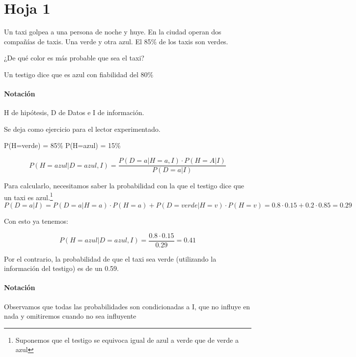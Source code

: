 
\section{Hoja 1}

\begin{problem}[1]

Un taxi golpea a una persona de noche y huye. En la ciudad operan dos compañías de taxis. Una verde y otra azul. El 85\% de los taxis son verdes. 

\ppart
¿De qué color es más probable que sea el taxi?

\ppart
Un testigo dice que es azul con fiabilidad del 80\%

\solution
\paragraph{Notación} H de hipótesis, D de Datos e I de información.

\spart
Se deja como ejercicio para el lector experimentado.

\spart
P(H=verde) = 85\%
P(H=azul) = 15\%

\[
P\left( H=azul | D=azul, I \right) = \frac{P(D=a|H=a,I)·P(H=A|I)}{P(D=a|I)}
\]

Para calcularlo, necesitamos saber la probabilidad con la que el testigo dice que un taxi es azul.\footnote{Suponemos que el testigo se equivoca igual de azul a verde que de verde a azul}
\[
P(D=a|I) = P(D=a|H=a)·P(H=a) + P(D=verde | H=v) · P(H=v) = 0.8·0.15 + 0.2·0.85 = 0.29
\]

Con esto ya tenemos:

\[
 P\left( H=azul | D=azul, I \right) = \frac{0.8·0.15}{0.29} = 0.41
\]

Por el contrario, la probabilidad de que el taxi sea verde (utilizando la información del testigo) es de un 0.59.

\paragraph{Notación} Observamos que todas las probabilidades son condicionadas a I, que no influye en nada y omitiremos cuando no sea influyente
\end{problem}


